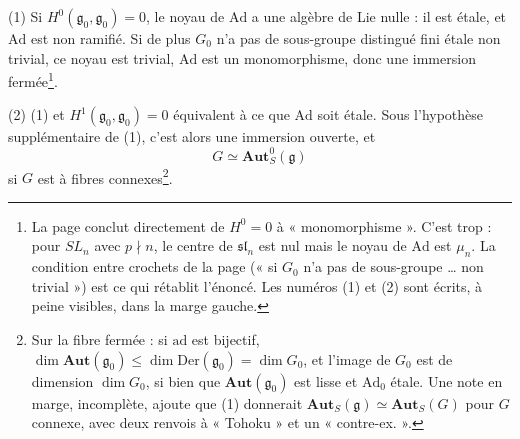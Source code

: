 \documentclass[11pt,a4paper]{article}
\begin{document}
(1) Si $H^0(\mathfrak{g}_0,\mathfrak{g}_0) = 0$, le noyau de $\mathrm{Ad}$ a une
algèbre de Lie nulle : il est étale, et $\mathrm{Ad}$ est non ramifié. Si de
plus $G_0$ n'a pas de sous-groupe distingué fini étale non trivial, ce noyau
est trivial, $\mathrm{Ad}$ est un monomorphisme, donc une immersion
fermée\footnote{La page conclut directement de $H^0 = 0$ à « monomorphisme ».
C'est trop : pour $SL_n$ avec $p \nmid n$, le centre de $\mathfrak{sl}_n$ est nul
mais le noyau de $\mathrm{Ad}$ est $\mu_n$. La condition entre crochets de la
page (« si $G_0$ n'a pas de sous-groupe … non trivial ») est ce qui rétablit
l'énoncé. Les numéros (1) et (2) sont écrits, à peine visibles, dans la marge
gauche.}.

(2) (1) et $H^1(\mathfrak{g}_0,\mathfrak{g}_0) = 0$ équivalent à ce que
$\mathrm{Ad}$ soit étale. Sous l'hypothèse supplémentaire de (1), c'est alors une
immersion ouverte, et
\[
G \simeq \mathbf{Aut}^0_S(\mathfrak{g})
\]
si $G$ est à fibres connexes\footnote{Sur la fibre fermée : si $\mathrm{ad}$ est
bijectif, $\dim \mathbf{Aut}(\mathfrak{g}_0) \leq \dim \mathrm{Der}(\mathfrak{g}_0)
= \dim G_0$, et l'image de $G_0$ est de dimension $\dim G_0$, si bien que
$\mathbf{Aut}(\mathfrak{g}_0)$ est lisse et $\mathrm{Ad}_0$ étale. Une note en
marge, incomplète, ajoute que (1) donnerait
$\mathbf{Aut}_S(\mathfrak{g}) \simeq \mathbf{Aut}_S(G)$ pour $G$ connexe, avec deux
renvois à « Tohoku » et un « contre-ex. ».}.
\end{document}
